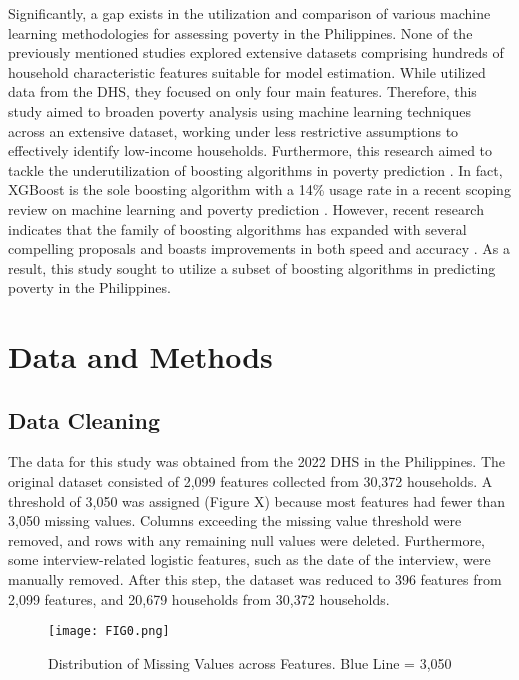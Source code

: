 \documentclass[a4paper,fleqn]{cas-sc}
\begin{document}
Significantly, a gap exists in the utilization and comparison of various machine learning methodologies for assessing poverty in the Philippines. None of the previously mentioned studies explored extensive datasets comprising hundreds of household characteristic features suitable for model estimation. While \cite{tingzon2019mapping} utilized data from the DHS, they focused on only four main features. Therefore, this study aimed to broaden poverty analysis using machine learning techniques across an extensive dataset, working under less restrictive assumptions to effectively identify low-income households. Furthermore, this research aimed to tackle the underutilization of boosting algorithms in poverty prediction \citep{li2022poverty}. In fact, XGBoost is the sole boosting algorithm with a 14\% usage rate in a recent scoping review on machine learning and poverty prediction \citep{usmanova2022utilities}. However, recent research indicates that the family of boosting algorithms has expanded with several compelling proposals and boasts improvements in both speed and accuracy \citep{bentejac2021comparative}. As a result, this study sought to utilize a subset of boosting algorithms in predicting poverty in the Philippines.

\section{Data and Methods}

\subsection{Data Cleaning}
The data for this study was obtained from the 2022 DHS in the Philippines. The original dataset consisted of 2,099 features collected from 30,372 households. A threshold of 3,050 was assigned (Figure X) because most features had fewer than 3,050 missing values. Columns exceeding the missing value threshold were removed, and rows with any remaining null values were deleted. Furthermore, some interview-related logistic features, such as the date of the interview, were manually removed. After this step, the dataset was reduced to 396 features from 2,099 features, and 20,679 households from 30,372 households.

\begin{figure}[htbp]
    \centering
    \texttt{[image: FIG0.png]} %
    \caption{Distribution of Missing Values across Features. Blue Line = 3,050}
\end{figure}
\end{document}

